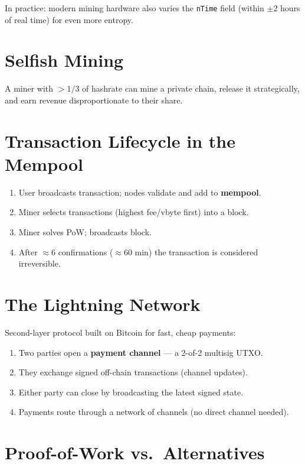 \documentclass[12pt,a4paper,openany]{book}
\theoremstyle{definition}
\theoremstyle{plain}
\theoremstyle{remark}
\begin{document}
In practice: modern mining hardware also varies the \texttt{nTime}
field (within $\pm 2$ hours of real time) for even more entropy.

\section{Selfish Mining}

A miner with $> 1/3$ of hashrate can mine a private chain, release it
strategically, and earn revenue disproportionate to their share.

\section{Transaction Lifecycle in the Mempool}

\begin{enumerate}
  \item User broadcasts transaction; nodes validate and add to \textbf{mempool}.
  \item Miner selects transactions (highest fee/vbyte first) into a block.
  \item Miner solves PoW; broadcasts block.
  \item After $\approx$6 confirmations ($\approx$60 min) the transaction
        is considered irreversible.
\end{enumerate}

\section{The Lightning Network}

Second-layer protocol built on Bitcoin for fast, cheap payments:
\begin{enumerate}
  \item Two parties open a \textbf{payment channel} — a 2-of-2 multisig UTXO.
  \item They exchange signed off-chain transactions (channel updates).
  \item Either party can close by broadcasting the latest signed state.
  \item Payments route through a network of channels (no direct channel needed).
\end{enumerate}

\section{Proof-of-Work vs.\ Alternatives}
\end{document}

